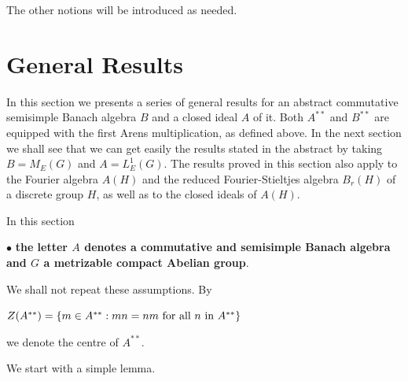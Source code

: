 \documentclass[12pt, twoside, leqno]{article}
\theoremstyle{definition}
\theoremstyle{definition}
\numberwithin{equation}{section}
\begin{document}
The other notions will be introduced as needed.
\section{General Results} In this section we presents a series of general results for an abstract commutative semisimple Banach algebra $ B $ and a closed ideal $ A $ of it. Both $ A^{**}$ and $ B^{**}$ are equipped with the first Arens multiplication, as defined above. In the next section we shall see that we can get easily the results stated in the abstract by taking $ B=M_{E}(G) $ and $ A=L^{1}_{E} (G)$. The results proved in this section also apply to the Fourier algebra $ A(H) $ and the reduced Fourier-Stieltjes algebra $ B_{r}(H) $ of a discrete group $ H $, as well as to the closed ideals of $ A(H) $. \vspace{2mm}

\noindent  In this section\vspace{1mm}

$\bullet$ \textbf{the letter $ A $ denotes a commutative and semisimple Banach algebra and $G$ a metrizable compact Abelian group}.\vspace{2mm}

\noindent We shall not repeat these assumptions.  By\vspace{2mm}

$ Z(A^{**})=\{m\in A^{**}:mn=nm \text{ for all $ n$ in } A^{**}\} $\vspace{2mm}

\noindent we denote the centre of $ A^{**} $. \vspace{2mm}

\noindent We start with a simple lemma.
\end{document}
